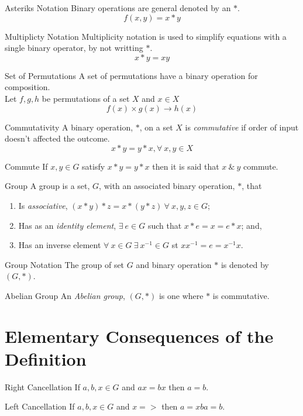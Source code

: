 \documentclass[11pt,a4paper]{article}
\begin{document}
\subtitle{Remark 2.02 - }{Asteriks Notation}
Binary operations are general denoted by an $*$. $$f(x, y) = x*y$$

\subtitle{Remark 2.03 - }{Multiplicty Notation}
Multiplicity notation is used to simplify equations with a single binary operator, by not writting $*$. $$x * y = xy$$

\subtitle{Remark 2.04 - }{Set of Permutations}
A set of permutations have a binary operation for composition.\\
Let $f, g, h$ be permutations of a set $X$ and $x \in X$ $$f(x) \times g(x) \to h(x)$$

\subtitle{Definition 2.05 - }{Commutativity}
A binary operation, $*$, on a set $X$ is \textit{commutative} if order of input doesn't affected the outcome. $$x * y = y * x,\forall\ x, y \in X$$

\subtitle{Definition 2.06 - }{Commute}
If $x, y \in G$ satisfy $x*y = y*x$ then it is said that $x\ \&\ y$ commute.\\

\subtitle{Defintion 2.07 - }{Group}
A group is a set, $G$, with an associated binary operation, $*$, that
\begin{enumerate}[label=\roman*)]
  \item Is \textit{associative}, $(x * y) * z = x * (y * z)\ \forall\ x, y, z \in G$;
  \item Has as an \textit{identity element}, $\exists\ e \in G$ such that $x * e = x = e * x$; and,
  \item Has an inverse element $\forall\ x \in G\ \exists\ x^{-1} \in G$ st $xx^{-1} = e = x^{-1}x$.\\
\end{enumerate}

\subtitle{Remark 2.08 - }{Group Notation}
The group of set $G$ and binary operation $*$ is denoted by $(G, *)$.\\

\subtitle{Definition 2.09 - }{Abelian Group}
An \textit{Abelian group}, $(G, *)$ is one where $*$ is commutative.

\section{Elementary Consequences of the Definition}

\subtitle{Proposition 3.01 - }{Right Cancellation}
If $a, b, x \in G$ and $ax = bx$ then $a = b$.\\

\subtitle{Proposition 3.02 - }{Left Cancellation}
If $a, b, x \in G$ and $x => $ then $a = xba = b$.\\
\end{document}
